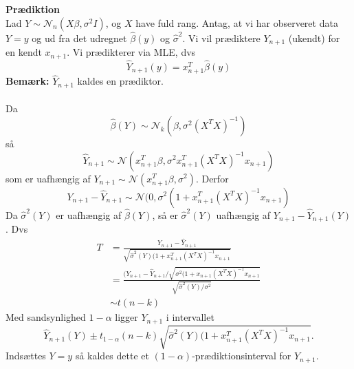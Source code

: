 \documentclass[12pt,a4paper]{report}
\begin{document}
\textbf{Prædiktion}\\
Lad $Y\sim\mathcal{N}_n(X\beta,\sigma^2I)$, og $X$ have fuld rang. Antag, at vi har observeret data $Y=y$ og ud fra det udregnet $\hat{\beta}(y)$ og $\hat{\sigma}^2$. Vi vil prædiktere $Y_{n+1}$ (ukendt) for en kendt $x_{n+1}$. Vi prædikterer via MLE, dvs
\begin{equation*}
\hat{Y}_{n+1}(y)=x_{n+1}^T\hat{\beta}(y)
\end{equation*}
\textbf{Bemærk:} $\hat{Y}_{n+1}$ kaldes en prædiktor.\\\\
Da \begin{equation*}
\hat{\beta}(Y)\sim\mathcal{N}_k(\beta,\sigma^2(X^TX)^{-1})
\end{equation*}
så
\begin{equation*}
\hat{Y}_{n+1}\sim\mathcal{N}(x_{n+1}^T\beta,\sigma^2x_{n+1}^T(X^TX)^{-1}x_{n+1})
\end{equation*}
som er uafhængig af $Y_{n+1}\sim\mathcal{N}(x_{n+1}^T\beta,\sigma^2)$. Derfor
\begin{equation*}
Y_{n+1}-\hat{Y}_{n+1}\sim\mathcal{N}(0,\sigma^2(1+x_{n+1}^T(X^TX)^{-1}x_{n+1})
\end{equation*}
Da $\hat{\sigma}^2(Y)$ er uafhængig af $\hat{\beta}(Y)$, så er  $\hat{\sigma}^2(Y)$ uafhængig af $Y_{n+1}-\hat{Y}_{n+1}(Y)$. Dvs
\begin{align*}
T&=\frac{Y_{n+1}-\hat{Y}_{n+1}}{\sqrt{\hat{\sigma}^2(Y)(1+x_{n+1}^T(X^TX)^{-1}x_{n+1}}}\\
&=\frac{(Y_{n+1}-\hat{Y}_{n+1}/\sqrt{\sigma^2(1+x_{n+1}(X^TX)^{-1}x_{n+1}}}{\sqrt{\hat{\sigma}^2(Y)/\sigma^2}}\\
&\sim t(n-k)
\end{align*}
Med sandsynlighed $1-\alpha$ ligger $Y_{n+1}$ i intervallet
\begin{equation*}
\hat{Y}_{n+1}(Y)\pm t_{1-\alpha}(n-k)\sqrt{\hat{\sigma}^2(Y)(1+x_{n+1}^T(X^TX)^{-1}x_{n+1}}.
\end{equation*}
Indsættes $Y=y$ så kaldes dette et $(1-\alpha)$-prædiktionsinterval for $Y_{n+1}$.
\end{document}
